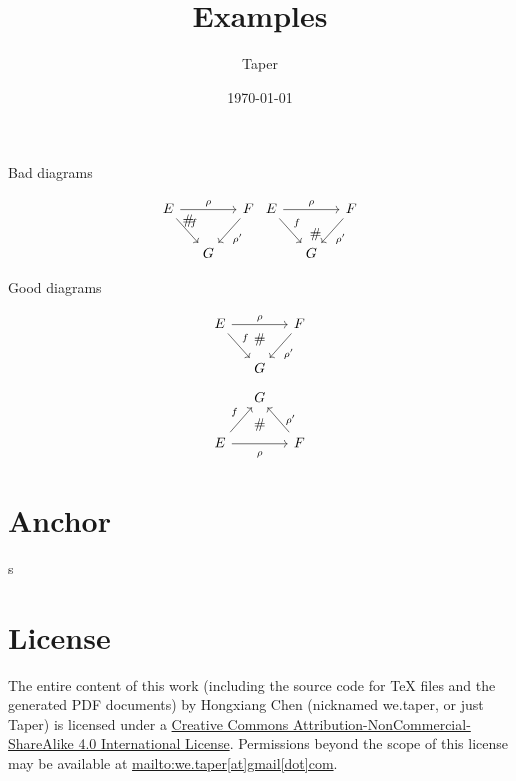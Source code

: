 \documentclass{article}
\title{Examples}
\date{\today}
\author{Taper}
\begin{document}
\maketitle
{}
\tableofcontents
{}
\begin{center}
    Bad diagrams
\end{center}
$$
    \begin{tikzcd}[column sep=small]
        E \ar[dr,"f"]\ar[rr,"\rho"]\ar[drr, phantom, "\#", very near
        start] & & F\ar[dl,"\rho'"] \\
        & G &  \,
    \end{tikzcd}
    \begin{tikzcd}[column sep=small]
        E \ar[dr,"f"]\ar[rr,"\rho"]\ar[drr, phantom, "\#"] & & F\ar[dl,"\rho'"] \\
        & G &  \,
    \end{tikzcd}
$$
\begin{center}
    Good diagrams
\end{center}
$$
    \begin{tikzcd}[column sep=small]
        E \ar[dr,"f"]\ar[rr,"\rho"] &
        \ar[d,phantom, "\#", near start] & F\ar[dl,"\rho'"] \\
        & G &  \,
    \end{tikzcd}
$$
$$ \begin{tikzcd}[column sep=small]
& G &  \, \\
E \ar[ur,"f"]\ar[rr,"\rho" below=3] &
\ar[u,phantom, "\#"] 
& F\ar[ul,"\rho'" right=3]
\end{tikzcd} $$

\section{Anchor}
\label{sec:Anchor}

\begin{thebibliography}{1}
      s
\end{thebibliography}
\printnomenclature
\section{License}
The entire content of this work (including the source code
for TeX files and the generated PDF documents) by 
Hongxiang Chen (nicknamed we.taper, or just Taper) is
licensed under a 
\href{http://creativecommons.org/licenses/by-nc-sa/4.0/}{Creative 
Commons Attribution-NonCommercial-ShareAlike 4.0 International 
License}. Permissions beyond the scope of this 
license may be available at \url{mailto:we.taper[at]gmail[dot]com}.
\end{document}
